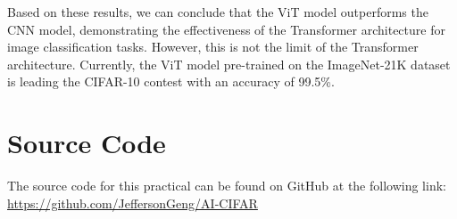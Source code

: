 \documentclass[12pt]{article}
\begin{document}
Based on these results, we can conclude that the ViT model outperforms the CNN model, demonstrating the effectiveness of the Transformer architecture for image classification tasks. 
However, this is not the limit of the Transformer architecture. 
Currently, the ViT model pre-trained on the ImageNet-21K dataset is leading the CIFAR-10 contest with an accuracy of 99.5\%.
\section{Source Code}
The source code for this practical can be found on GitHub at the following link:
\url{https://github.com/JeffersonGeng/AI-CIFAR}
\end{document}
